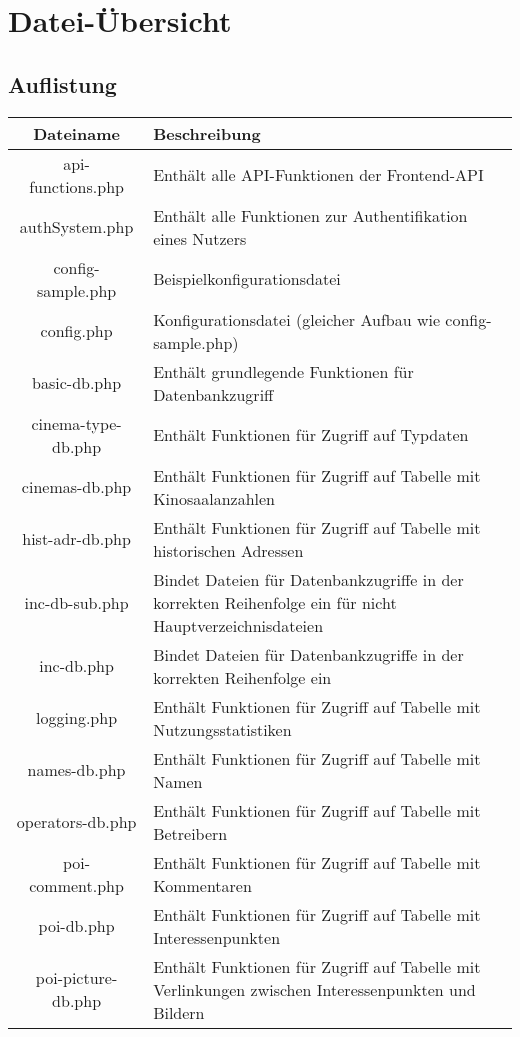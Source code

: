 \chapter{Datei-Übersicht}
\section{Auflistung}
\begin{longtable}[H]{|c|p{10cm}|}
	\hline
	\textbf{Dateiname} & \textbf{Beschreibung} \\ \hline
	api-functions.php & Enthält alle API-Funktionen der Frontend-API \\ \hline
	authSystem.php & Enthält alle Funktionen zur Authentifikation eines Nutzers \\ \hline
	config-sample.php & Beispielkonfigurationsdatei \\ \hline
	config.php & Konfigurationsdatei (gleicher Aufbau wie config-sample.php) \\ \hline
	basic-db.php & Enthält grundlegende Funktionen für Datenbankzugriff \\ \hline
	cinema-type-db.php & Enthält Funktionen für Zugriff auf Typdaten \\ \hline
	cinemas-db.php & Enthält Funktionen für Zugriff auf Tabelle mit Kinosaalanzahlen \\ \hline
	hist-adr-db.php & Enthält Funktionen für Zugriff auf Tabelle mit historischen Adressen \\ \hline
	inc-db-sub.php & Bindet Dateien für Datenbankzugriffe in der korrekten Reihenfolge ein für nicht Hauptverzeichnisdateien \\ \hline
	inc-db.php & Bindet Dateien für Datenbankzugriffe in der korrekten Reihenfolge ein \\ \hline
	logging.php & Enthält Funktionen für Zugriff auf Tabelle mit Nutzungsstatistiken \\ \hline
	names-db.php & Enthält Funktionen für Zugriff auf Tabelle mit Namen \\ \hline
	operators-db.php & Enthält Funktionen für Zugriff auf Tabelle mit Betreibern \\ \hline
	poi-comment.php & Enthält Funktionen für Zugriff auf Tabelle mit Kommentaren \\ \hline
	poi-db.php & Enthält Funktionen für Zugriff auf Tabelle mit Interessenpunkten \\ \hline
	poi-picture-db.php & Enthält Funktionen für Zugriff auf Tabelle mit Verlinkungen zwischen Interessenpunkten und Bildern \\ \hline

\end{longtable}
